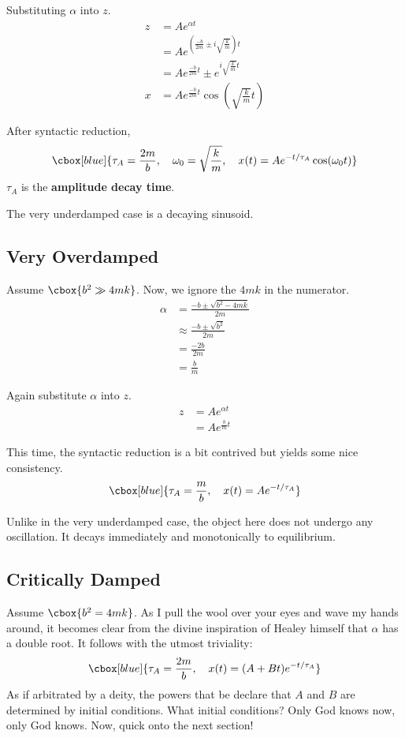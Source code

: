 \documentclass{hw}
\renewcommand\emph[1]{{\bf\color{BlueViolet}#1}}
\begin{document}
Substituting $\alpha$ into $z$.
\begin{align*}
  z &= Ae^{\alpha t} \\
    &= Ae^{(\frac{-b}{2m} \pm i\sqrt{\frac{k}{m}})t} \\
    &= Ae^{\frac{-b}{2m}t} \pm e^{i\sqrt{\frac{k}{m}}t} \\
  x &= Ae^{\frac{-b}{2m}t} \cos\left(\sqrt{\frac{k}{m}}t\right) 
\end{align*}

After syntactic reduction,
\[\cbox[blue]{
  \tau_A = \frac{2m}{b}, \quad
  \omega_0 = \sqrt{\frac{k}{m}}, \quad
  x(t) = Ae^{-t/\tau_A} \cos(\omega_0 t)
}\]
$\tau_A$ is the \emph{amplitude decay time}. 

The very underdamped case is a decaying sinusoid.

\subsection{Very Overdamped}
Assume $\cbox{b^2 \gg 4mk}$. Now, we ignore the $4mk$ in the numerator.
\begin{align*}
  \alpha &= \frac{-b \pm \sqrt{b^2 - 4mk}}{2m} \\
         &\approx \frac{-b \pm \sqrt{b^2}}{2m} \\
         &= \frac{-2b}{2m} \\
         &= \frac{b}{m}
\end{align*}

Again substitute $\alpha$ into $z$.
\begin{align*}
  z &= Ae^{\alpha t} \\
    &= Ae^{\frac{b}{m} t} 
\end{align*}

This time, the syntactic reduction is a bit contrived but yields some nice
consistency.
\[\cbox[blue]{
  \tau_A = \frac{m}{b}, \quad x(t) = Ae^{-t/\tau_A}
}\]

Unlike in the very underdamped case, the object here does not undergo any
oscillation. It decays immediately and monotonically to equilibrium.

\subsection{Critically Damped}
Assume $\cbox{b^2 = 4mk}$. As I pull the wool over your eyes and wave my hands
around, it becomes clear from the divine inspiration of Healey himself that
$\alpha$ has a double root. It follows with the utmost triviality:
\[\cbox[blue]{
  \tau_A = \frac{2m}{b}, \quad x(t) = (A + Bt)e^{-t/\tau_A}
}\]
As if arbitrated by a deity, the powers that be declare that $A$ and $B$ are
determined by initial conditions. What initial conditions? Only God knows now,
only God knows. Now, quick onto the next section!
\end{document}
